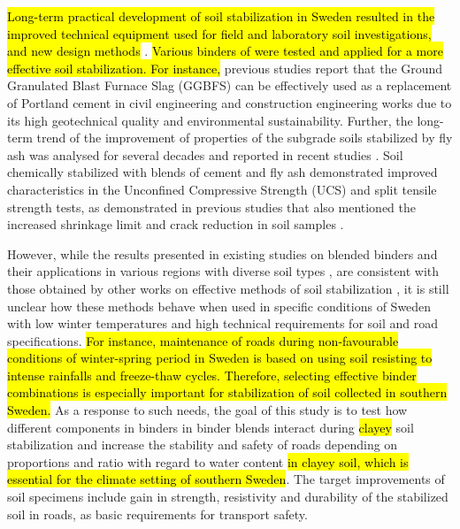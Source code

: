\documentclass[constrmater,article,submit,pdftex,moreauthors]{Definitions/mdpi}
\begin{document}
\hl{Long-term practical development of soil stabilization in Sweden resulted in the improved technical equipment used for field and laboratory soil investigations, and new design methods} \cite{Bjerrum}. \hl{Various binders of were tested and applied for a more effective soil stabilization. For instance, }previous studies report \cite{Higgins,electronics11223726} that the Ground Granulated Blast Furnace Slag (GGBFS) can be effectively used as a replacement of Portland cement in civil engineering and construction engineering works due to its high geotechnical quality and environmental sustainability. Further, the long-term trend of the improvement of properties of the subgrade soils stabilized by fly ash was analysed for several decades and reported in recent studies \cite{Parsons}. Soil chemically stabilized with blends of cement and fly ash demonstrated improved characteristics in the Unconfined Compressive Strength (UCS) and split tensile strength tests, as demonstrated in previous studies that also mentioned the increased shrinkage limit and crack reduction in soil samples \cite{Olgun}.

However, while the results presented in existing studies on blended binders and their applications in various regions with diverse soil types \cite{Jie,Holz,Jamnongpipatkul}, are consistent with those obtained by other works on effective methods of soil stabilization \cite{Moh}, it is still unclear how these methods behave when used in specific conditions of Sweden with low winter temperatures and high technical requirements for soil and road specifications. \hl{For instance, maintenance of roads during non-favourable conditions of winter-spring period in Sweden is based on using soil resisting to intense rainfalls and freeze-thaw cycles. Therefore, selecting effective binder combinations is especially important for stabilization of soil collected in southern Sweden.} As a response to such needs, the goal of this study is to test how different components in binders in binder blends interact during \hl{clayey }soil stabilization and increase the stability and safety of roads depending on proportions and ratio with regard to water content\hl{ in clayey soil, which is essential for the climate setting of southern Sweden}. The target improvements of soil specimens include gain in strength, resistivity and durability of the stabilized soil in roads, as basic requirements for transport safety.
\end{document}
